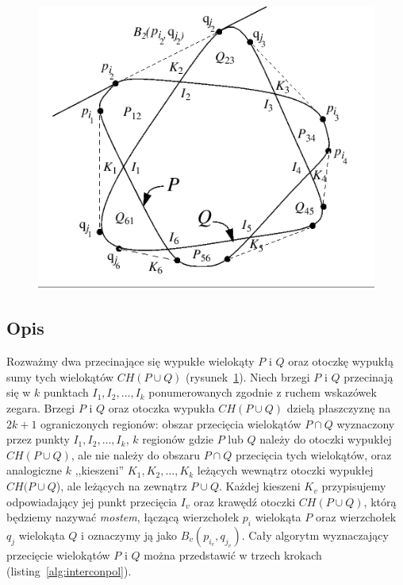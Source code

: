 \begin{figure}[htb]
  \centering
  \includegraphics[scale=0.7]{img/toussaint1}
  \caption{\label{img:toussaint1}}
\end{figure}

\subsection{Opis}
Rozważmy dwa przecinające się wypukłe wielokąty $P$ i $Q$ oraz otoczkę
wypukłą sumy tych wielokątów $CH(P \cup Q)$
(rysunek~\ref{img:toussaint1}). Niech brzegi $P$ i $Q$ przecinają się
w $k$ punktach $I_1, I_2, \ldots, I_k$ ponumerowanych zgodnie z ruchem
wskazówek zegara. Brzegi $P$ i $Q$ oraz otoczka wypukła $CH(P \cup Q)$
dzielą płaszczyznę na $2k + 1$ ograniczonych regionów: obszar
przecięcia wielokątów $P \cap Q$ wyznaczony przez punkty $I_1, I_2,
\ldots, I_k$, $k$ regionów gdzie $P$ lub $Q$ należy do otoczki
wypukłej $CH(P \cup Q)$, ale nie należy do obszaru $P \cap Q$
przecięcia tych wielokątów, oraz analogiczne $k$ ,,kieszeni'' $K_1,
K_2, \ldots, K_k$ leżących wewnątrz otoczki wypukłej $CH(P \cup Q$),
ale leżących na zewnątrz $P \cup Q$. Każdej kieszeni $K_v$
przypisujemy odpowiadający jej punkt przecięcia $I_v$ oraz krawędź
otoczki $CH(P \cup Q)$, którą będziemy nazywać \emph{mostem}, łączącą
wierzchołek $p_i$ wielokąta $P$ oraz wierzchołek $q_j$ wielokąta $Q$ i
oznaczymy ją jako $B_{v}(p_{i_v}, q_{j_v})$. Cały algorytm
wyznaczający przecięcie wielokątów $P$ i $Q$ można przedstawić w
trzech krokach (listing~\ref{alg:interconpol}).

